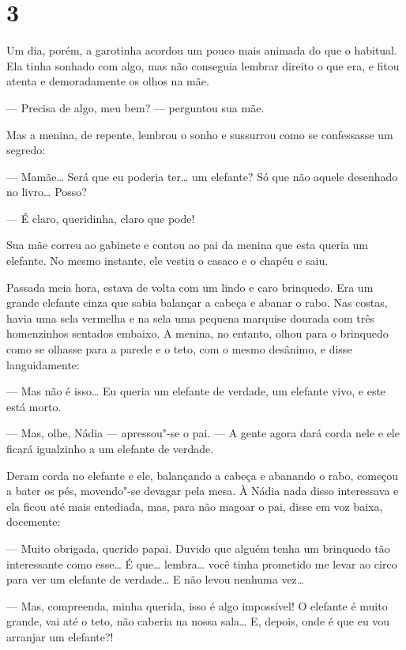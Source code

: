 \section{3}

Um dia, porém, a garotinha acordou um pouco mais animada do que o
habitual. Ela tinha sonhado com algo, mas não conseguia lembrar direito
o que era, e fitou atenta e demoradamente os olhos na mãe.

--- Precisa de algo, meu bem? --- perguntou sua mãe.

Mas a menina, de repente, lembrou o sonho e sussurrou como se
confessasse um segredo:

--- Mamãe\ldots{} Será que eu poderia ter\ldots{} um elefante? Só que não aquele
desenhado no livro\ldots{} Posso?

--- É claro, queridinha, claro que pode!

Sua mãe correu ao gabinete e contou ao pai da menina que esta queria um
elefante. No mesmo instante, ele vestiu o casaco e o chapéu e saiu.

Passada meia hora, estava de volta com um lindo e caro brinquedo. Era um
grande elefante cinza que sabia balançar a cabeça e abanar o rabo. Nas
costas, havia uma sela vermelha e na sela uma pequena marquise dourada
com três homenzinhos sentados embaixo. A menina, no entanto, olhou para
o brinquedo como se olhasse para a parede e o teto, com o mesmo
desânimo, e disse languidamente:

--- Mas não é isso\ldots{} Eu queria um elefante de verdade, um elefante
vivo, e este está morto.

--- Mas, olhe, Nádia --- apressou"-se o pai. --- A gente agora dará corda
nele e ele ficará igualzinho a um elefante de verdade.

Deram corda no elefante e ele, balançando a cabeça e abanando o rabo,
começou a bater os pés, movendo"-se devagar pela mesa. À Nádia nada
disso interessava e ela ficou até mais entediada, mas, para não magoar
o pai, disse em voz baixa, docemente:

--- Muito obrigada, querido papai. Duvido que alguém tenha um brinquedo
tão interessante como esse\ldots{} É que\ldots{} lembra\ldots{} você tinha prometido me
levar ao circo para ver um elefante de verdade\ldots{} E não levou nenhuma
vez\ldots{}

--- Mas, compreenda, minha querida, isso é algo impossível! O elefante
é muito grande, vai até o teto, não caberia na nossa sala\ldots{} E, depois,
onde é que eu vou arranjar um elefante?!

